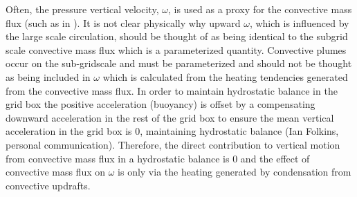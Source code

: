 \documentclass[letterpaper,12pt,titlepage,oneside,final]{book}
\begin{document}
Often, the pressure vertical velocity, $\omega$, is used as a proxy for the convective mass flux (such as in \cite{vecchi_global_2007,schneider_water_2010}). It is not clear physically why upward $\omega$, which is influenced by the large scale circulation, should be thought of as being identical to the subgrid scale convective mass flux which is a parameterized quantity. Convective plumes occur on the sub-gridscale and must be parameterized and should not be thought as being included in $\omega$ which is calculated from the heating tendencies generated from the convective mass flux. In order to maintain hydrostatic balance in the grid box the positive acceleration (buoyancy) is offset by a compensating downward acceleration in the rest of the grid box to ensure the mean vertical acceleration in the grid box is 0, maintaining hydrostatic balance (Ian Folkins, personal communication).  Therefore, the direct contribution to vertical motion from convective mass flux in a hydrostatic balance is 0 and the effect of convective mass flux on $\omega$ is only via the heating generated by condensation from convective updrafts.
\end{document}
